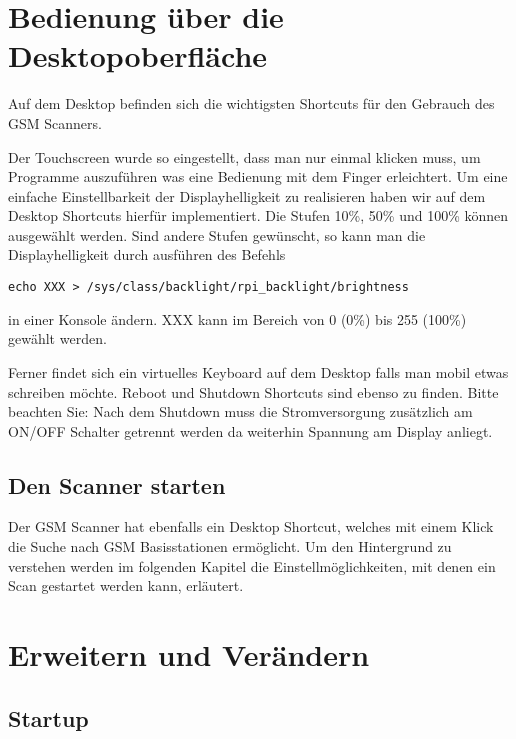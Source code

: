 \section{Bedienung über die Desktopoberfläche}

Auf dem Desktop befinden sich die wichtigsten Shortcuts für den Gebrauch des \ac{GSM} Scanners. 



Der Touchscreen wurde so eingestellt, dass man nur einmal klicken muss, um Programme auszuführen was eine Bedienung mit dem Finger erleichtert. Um eine einfache Einstellbarkeit der Displayhelligkeit zu realisieren haben wir auf dem Desktop Shortcuts hierfür implementiert. Die Stufen 10\%, 50\% und 100\% können ausgewählt werden. Sind andere Stufen gewünscht, so kann man die Displayhelligkeit durch ausführen des Befehls

\begin{verbatim}
echo XXX > /sys/class/backlight/rpi_backlight/brightness
\end{verbatim}

in einer Konsole ändern. XXX kann im Bereich von 0 (0\%) bis 255 (100\%) gewählt werden. 

Ferner findet sich ein virtuelles Keyboard auf dem Desktop falls man mobil etwas schreiben möchte. Reboot und Shutdown Shortcuts sind ebenso zu finden. Bitte beachten Sie: Nach dem Shutdown muss die Stromversorgung zusätzlich am ON/OFF Schalter getrennt werden da weiterhin Spannung am Display anliegt.

\subsection{Den Scanner starten}

Der \ac{GSM} Scanner hat ebenfalls ein Desktop Shortcut, welches mit einem Klick die Suche nach \ac{GSM} Basisstationen ermöglicht. Um den Hintergrund zu verstehen werden im folgenden Kapitel die Einstellmöglichkeiten, mit denen ein Scan gestartet werden kann, erläutert. 

\section{Erweitern und Verändern}
\subsection{Startup}

